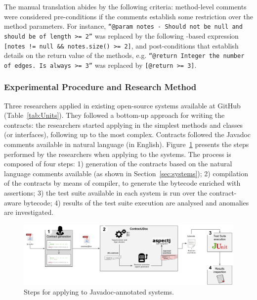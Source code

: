 The manual translation abides by the following criteria: method-level comments were considered pre-conditions
if the comments establish some restriction over the method parameters.
For instance, \texttt{``@param notes - Should not be null and should be of length >= 2''} was
replaced by the following \contractjdoc{}-based expression \texttt{[notes != null \&\& notes.size() >= 2]}, and
post-conditions that establish details on the return value of the
methods, e.g. \texttt{``@return Integer the number of edges. Is always >= 3''}
was replaced by \texttt{[@return >= 3]}. 

\subsubsection{Experimental Procedure and Research Method} 

Three researchers applied \contractjdoc{} in \totalSystems{} existing open-source systems
available at GitHub (Table~\ref{tab:Units}). They followed a bottom-up approach for
writing the \contractjdoc{} contracts: the researchers started applying
\contractjdoc{} in the simplest methods and classes (or interfaces), following
up to the most complex. Contracts followed the Javadoc comments available in
natural language (in English).
Figure~\ref{fig:applicationProcess} presents the steps performed by the researchers when applying
\contractjdoc{} to the systems. The process is composed of four steps: 1) generation of the
contracts based on the natural language comments available (as shown in
Section~\ref{sec:systems}); 2) compilation of the contracts by means of
\contractjdocCompiler{} compiler, to generate the bytecode enriched with assertions; 3) the test suite available in each system is run over the contract-aware bytecode; 4) results of the test suite execution are analysed and
anomalies are investigated.

\begin{figure}[h]
\centering
\includegraphics[width=1.0\textwidth]{figs/ContractJDocProcess}
\caption{Steps for applying \contractjdoc{} to Javadoc-annotated systems.}
\label{fig:applicationProcess}
\end{figure}

